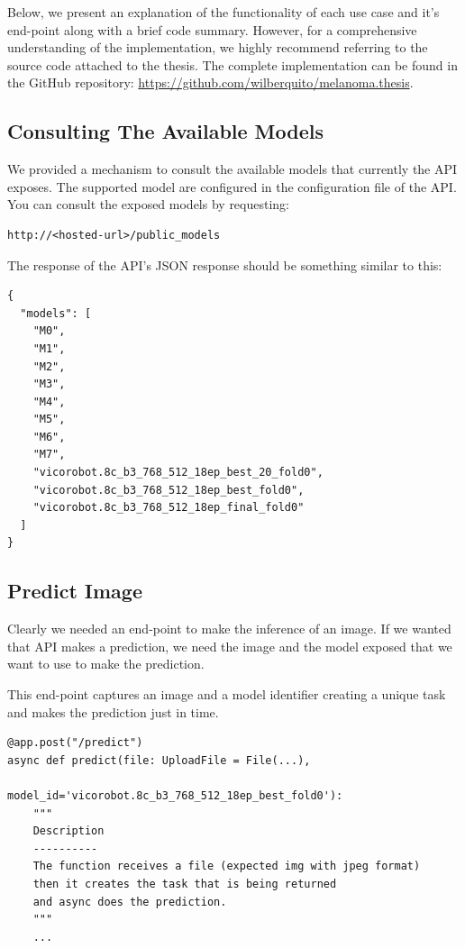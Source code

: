 Below, we present an explanation of the functionality of each use case and it's end-point along with a brief code summary.
However, for a comprehensive understanding of the implementation, we highly recommend referring to the source code attached to the thesis.
The complete implementation can be found in the GitHub repository: \url{https://github.com/wilberquito/melanoma.thesis}.

\subsection{Consulting The Available Models}

We provided a mechanism to consult the available models that currently the API exposes.
The supported model are configured in the configuration file of the API. \\

You can consult the exposed models by requesting:

\begin{Verbatim}[fontsize=\scriptsize]
http://<hosted-url>/public_models
\end{Verbatim}

The response of the API's JSON response should be something similar to this:

\begin{Verbatim}[fontsize=\scriptsize]
{
  "models": [
    "M0",
    "M1",
    "M2",
    "M3",
    "M4",
    "M5",
    "M6",
    "M7",
    "vicorobot.8c_b3_768_512_18ep_best_20_fold0",
    "vicorobot.8c_b3_768_512_18ep_best_fold0",
    "vicorobot.8c_b3_768_512_18ep_final_fold0"
  ]
}
\end{Verbatim}

\subsection{Predict Image}

Clearly we needed an end-point to make the inference of an image. If we wanted
that API makes a prediction, we need the image and the model exposed that
we want to use to make the prediction.

This end-point captures an image and a model identifier creating a unique task and makes the prediction just in time.

\begin{Verbatim}[fontsize=\scriptsize]
@app.post("/predict")
async def predict(file: UploadFile = File(...),
                    model_id='vicorobot.8c_b3_768_512_18ep_best_fold0'):
    """
    Description
    ----------
    The function receives a file (expected img with jpeg format)
    then it creates the task that is being returned
    and async does the prediction.
    """
    ...
\end{Verbatim}

